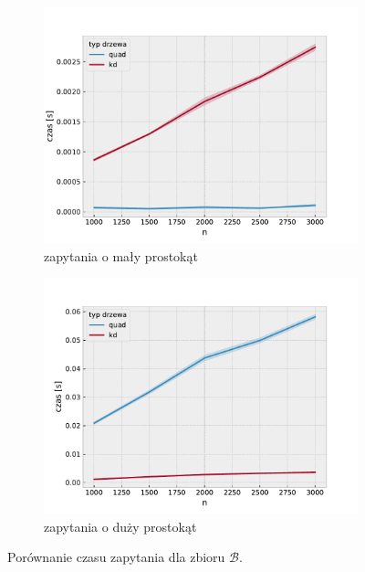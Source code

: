 \documentclass[12pt]{scrartcl}
\newcommand{\sB}{\mathcal B}
\begin{document}
\begin{figure}[H]
    \begin{subfigure}{0.5\textwidth}
        \includegraphics[width=\textwidth]{imgs/pairs_find_small_time}
        \caption{zapytania o mały prostokąt}
        \label{fig:pairs find small time}
    \end{subfigure}
    \begin{subfigure}{0.5\textwidth}
        \includegraphics[width=\textwidth]{imgs/pairs_find_big_time}
        \caption{zapytania o duży prostokąt}
        \label{fig:pairs find big time}
    \end{subfigure}
    \caption{Porównanie czasu zapytania dla zbioru $\sB$.}
\end{figure}
\end{document}
